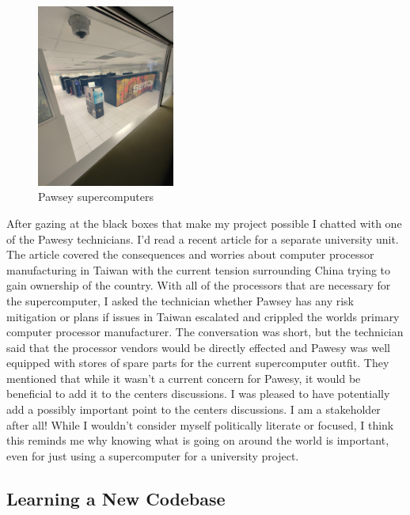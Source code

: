 \documentclass[11pt]{article}
\begin{document}
\begin{figure}[h!]
  \centering
  \includegraphics[height=6cm,angle=-90,origin=c]{graphics/pawsey}
  \caption{Pawsey supercomputers}
  \label{fig:pawsey}
\end{figure}
\FloatBarrier

After gazing at the black boxes that make my project possible I chatted with one of the Pawesy technicians. I'd read a recent article for a separate university unit. The article covered the consequences and worries about computer processor manufacturing in Taiwan with the current tension surrounding China trying to gain ownership of the country. With all of the processors that are necessary for the supercomputer, I asked the technician whether Pawsey has any risk mitigation or plans if issues in Taiwan escalated and crippled the worlds primary computer processor manufacturer. The conversation was short, but the technician said that the processor vendors would be directly effected and Pawesy was well equipped with stores of spare parts for the current supercomputer outfit. They mentioned that while it wasn't a current concern for Pawesy, it would be beneficial to add it to the centers discussions. I was pleased to have potentially add a possibly important point to the centers discussions. I am a stakeholder after all! While I wouldn't consider myself politically literate or focused, I think this reminds me why knowing what is going on around the world is important, even for just using a supercomputer for a university project.

\subsection{Learning a New Codebase}
\end{document}
